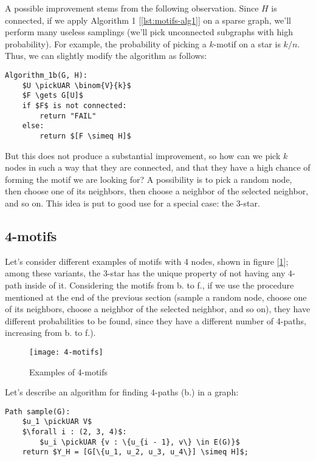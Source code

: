 A possible improvement stems from the following observation. Since $H$ is connected, if we apply Algorithm 1 [\ref{lst:motifs-alg1}] on a sparse graph, we'll perform many useless samplings (we'll pick unconnected subgraphs with high probability). For example, the probability of picking a $k$-motif on a star is $k/n$. Thus, we can slightly modify the algorithm as follows:
\begin{lstlisting}[caption={Algorithm 1b}, label={lst:motifs-alg1b}]
Algorithm_1b(G, H):
    $U \pickUAR \binom{V}{k}$
    $F \gets G[U]$
    if $F$ is not connected:
        return "FAIL"
    else:
        return $[F \simeq H]$
\end{lstlisting}
But this does not produce a substantial improvement, so how can we pick $k$ nodes in such a way that they are connected, and that they have a high chance of forming the motif we are looking for? A possibility is to pick a random node, then choose one of its neighbors, then choose a neighbor of the selected neighbor, and so on. This idea is put to good use for a special case: the 3-star.


\subsection{4-motifs}

Let's consider different examples of motifs with 4 nodes, shown in figure [\ref{fig:4-motifs}]; among these variants, the 3-star has the unique property of not having any $4$-path inside of it. Considering the motifs from b. to f., if we use the procedure mentioned at the end of the previous section (sample a random node, choose one of its neighbors, choose a neighbor of the selected neighbor, and so on), they have different probabilities to be found, since they have a different number of 4-paths, increasing from b. to f.).

\begin{figure}
    \centering
    \texttt{[image: 4-motifs]}
    \caption{Examples of 4-motifs}
    \label{fig:4-motifs}
\end{figure}

Let's describe an algorithm for finding 4-paths (b.) in a graph:
\begin{lstlisting}[caption={Algorithm 2 (Path sample)}, label={lst:motifs-alg2}]
Path sample(G):
    $u_1 \pickUAR V$
    $\forall i : (2, 3, 4)$:
        $u_i \pickUAR {v : \{u_{i - 1}, v\} \in E(G)}$
    return $Y_H = [G[\{u_1, u_2, u_3, u_4\}] \simeq H]$;
\end{lstlisting}

